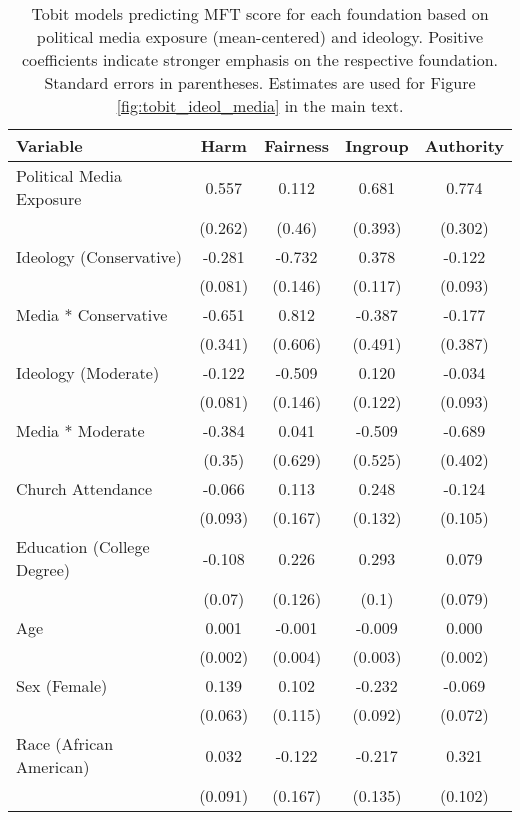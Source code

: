 \begin{table}[ht]
\centering
\caption{Tobit models predicting MFT score for each foundation based 
           on political media exposure (mean-centered) and ideology. Positive coefficients indicate 
           stronger emphasis on the respective foundation. Standard errors in parentheses. Estimates 
           are used for Figure \ref{fig:tobit_ideol_media} in the main text.} 
\label{tab:tobit_ideol_media}
\begingroup\footnotesize
\begin{tabular}{lcccc}
  \hline
Variable & Harm & Fairness & Ingroup & Authority \\ 
  \hline
Political Media Exposure &  0.557 &  0.112 &  0.681 &  0.774 \\ 
   & (0.262) & (0.46) & (0.393) & (0.302) \\ 
  Ideology (Conservative) & -0.281 & -0.732 &  0.378 & -0.122 \\ 
   & (0.081) & (0.146) & (0.117) & (0.093) \\ 
  Media * Conservative & -0.651 &  0.812 & -0.387 & -0.177 \\ 
   & (0.341) & (0.606) & (0.491) & (0.387) \\ 
  Ideology (Moderate) & -0.122 & -0.509 &  0.120 & -0.034 \\ 
   & (0.081) & (0.146) & (0.122) & (0.093) \\ 
  Media * Moderate & -0.384 &  0.041 & -0.509 & -0.689 \\ 
   & (0.35) & (0.629) & (0.525) & (0.402) \\ 
  Church Attendance & -0.066 &  0.113 &  0.248 & -0.124 \\ 
   & (0.093) & (0.167) & (0.132) & (0.105) \\ 
  Education (College Degree) & -0.108 &  0.226 &  0.293 &  0.079 \\ 
   & (0.07) & (0.126) & (0.1) & (0.079) \\ 
  Age &  0.001 & -0.001 & -0.009 &  0.000 \\ 
   & (0.002) & (0.004) & (0.003) & (0.002) \\ 
  Sex (Female) &  0.139 &  0.102 & -0.232 & -0.069 \\ 
   & (0.063) & (0.115) & (0.092) & (0.072) \\ 
  Race (African American) &  0.032 & -0.122 & -0.217 &  0.321 \\ 
   & (0.091) & (0.167) & (0.135) & (0.102) \\ 

\end{tabular}
\end{table}
